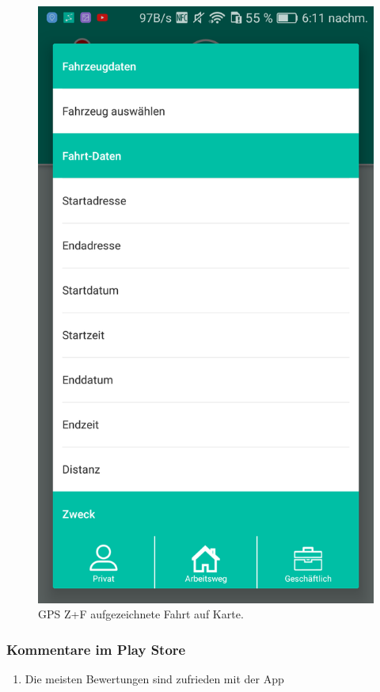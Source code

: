 \documentclass[a4paper]{article}
\begin{document}
\begin{figure}[H]
\begin{minipage}[b]{.4\linewidth}
        \includegraphics[scale=0.14]{img/squ4}
        \caption{\label{img:img/squ4}GPS Z+F aufgezeichnete Fahrt auf Karte.}
    \end{minipage}
\end{figure}

\subsubsection{Kommentare im Play Store}
\begin{enumerate}
    \item Die meisten Bewertungen sind zufrieden mit der App
\end{enumerate}
\end{document}
